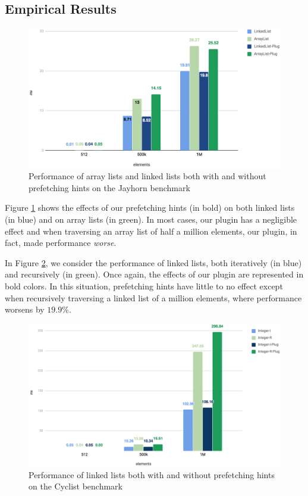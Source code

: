 \documentclass[journal]{IEEEtran}
\begin{document}
\subsection{Empirical Results}

\begin{figure}[t]
    \includegraphics[width=0.9\linewidth]{jayhorn.png}
    \caption{\small Performance of array lists and linked lists both with and without prefetching hints on the Jayhorn benchmark}
    \label{fig:jayhorn}
\end{figure}

Figure \ref{fig:jayhorn} shows the effects of our prefetching hints (in bold) on both linked lists (in blue) and on array lists (in green). In most cases, our plugin has a negligible effect and when traversing an array list of half a million elements, our plugin, in fact, made performance \textit{worse}.

In Figure \ref{fig:cyclistLL}, we consider the performance of linked lists, both iteratively (in blue) and recursively (in green). Once again, the effects of our plugin are represented in bold colors. In this situation, prefetching hints have little to no effect except when recursively traversing a linked list of a million elements, where performance worsens by $19.9\%$.

\begin{figure}[t]
    \includegraphics[width=0.9\linewidth]{cyclistLL.png}
    \caption{\small Performance of linked lists both with and without prefetching hints on the Cyclist benchmark}
    \label{fig:cyclistLL}
\end{figure}
\end{document}
